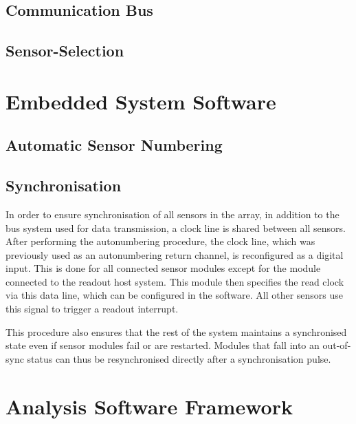 \documentclass[conference]{IEEEtran}
\begin{document}
\subsection{Communication Bus}

\subsection{Sensor-Selection}


\section{Embedded System Software}

\subsection{Automatic Sensor Numbering}


\subsection{Synchronisation}

In order to ensure synchronisation of all sensors in the array, in addition to the bus system used for data transmission, a clock line is shared between all sensors.
After performing the autonumbering procedure, the clock line, which was previously used as an autonumbering return channel, is reconfigured as a digital input.
This is done for all connected sensor modules except for the module connected to the readout host system.
This module then specifies the read clock via this data line, which can be configured in the software.
All other sensors use this signal to trigger a readout interrupt.

This procedure also ensures that the rest of the system maintains a synchronised state even if sensor modules fail or are restarted.
Modules that fall into an out-of-sync status can thus be resynchronised directly after a synchronisation pulse.


\section{Analysis Software Framework}
\end{document}
